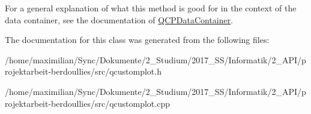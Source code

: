 For a general explanation of what this method is good for in the context of the data container, see the documentation of \hyperlink{class_q_c_p_data_container}{Q\+C\+P\+Data\+Container}. 

The documentation for this class was generated from the following files\+:\begin{DoxyCompactItemize}
\item 
/home/maximilian/\+Sync/\+Dokumente/2\+\_\+\+Studium/2017\+\_\+\+S\+S/\+Informatik/2\+\_\+\+A\+P\+I/projektarbeit-\/berdoullies/src/qcustomplot.\+h\item 
/home/maximilian/\+Sync/\+Dokumente/2\+\_\+\+Studium/2017\+\_\+\+S\+S/\+Informatik/2\+\_\+\+A\+P\+I/projektarbeit-\/berdoullies/src/qcustomplot.\+cpp\end{DoxyCompactItemize}
